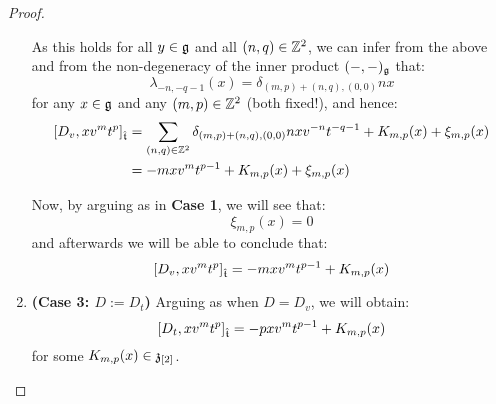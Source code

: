 \begin{proof}
\begin{enumerate}
                    As this holds for all $y \in \mathfrak{g}$ and all $(n, q) \in \mathbb{Z}^2$, we can infer from the above and from the non-degeneracy of the inner product $(-, -)_{\mathfrak{g}}$ that:
                        $$\lambda_{-n, -q - 1}(x) = \delta_{(m, p) + (n, q), (0, 0)} n x$$
                    for any $x \in \mathfrak{g}$ and any $(m, p) \in \mathbb{Z}^2$ (both fixed!), and hence:
                        $$
                            \begin{aligned}
                                [D_v, x v^m t^p]_{\extendedtoroidal} & = \sum_{(n, q) \in \Z^2} \delta_{(m, p) + (n, q), (0, 0)} n x v^{-n} t^{-q - 1} + K_{m, p}(x) + \xi_{m, p}(x)
                                \\
                                & = -m x v^m t^{p - 1} + K_{m, p}(x) + \xi_{m, p}(x)
                            \end{aligned}
                        $$
    
                    Now, by arguing as in \textbf{Case 1}, we will see that:
                        $$\xi_{m, p}(x) = 0$$
                    and afterwards we will be able to conclude that:
                        $$[D_v, x v^m t^p]_{\hat{\mathfrak{t}}} = -m x v^m t^{p - 1} + K_{m, p}(x)$$
                    \item \textbf{(Case 3: $D := D_t$)} Arguing as when $D = D_v$, we will obtain:
                        $$[D_t, x v^m t^p]_{\hat{\mathfrak{t}}} = -p x v^m t^{p - 1} + K_{m, p}(x)$$
                    for some $K_{m, p}(x) \in \mathfrak{z}_{[2]}$.
                \end{enumerate}


\end{proof}
